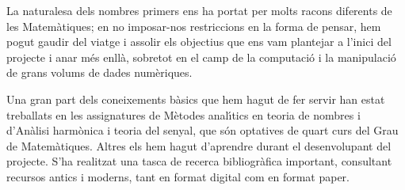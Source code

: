 \documentclass[11pt,a4paper,openright,oneside]{article}
\numberwithin{equation}{section}
\theoremstyle{definition}
\begin{document}
La naturalesa dels nombres primers ens ha portat per molts racons diferents de les Matem\`atiques; en no imposar-nos restriccions en la forma de pensar, hem pogut gaudir del viatge i assolir els objectius que ens vam plantejar a l'inici del projecte i anar m\'es enll\`a, sobretot en el camp de la computaci\'o i la manipulaci\'o de grans volums de dades num\`eriques.

Una gran part dels coneixements b\`asics que hem hagut de fer servir han estat treballats en les assignatures de M\`etodes anal\'{\i}tics en teoria de nombres i d'An\`alisi harm\`onica i teoria del senyal, que s\'on optatives de quart curs del Grau de Ma\-te\-m\`a\-ti\-ques. Altres els hem hagut d'aprendre durant el desenvolupant del projecte. S'ha realitzat una tasca de recerca bibliogr\`afica important, consultant recursos antics i moderns, tant en format digital com en format paper.

\normalfont

\newpage
\end{document}
